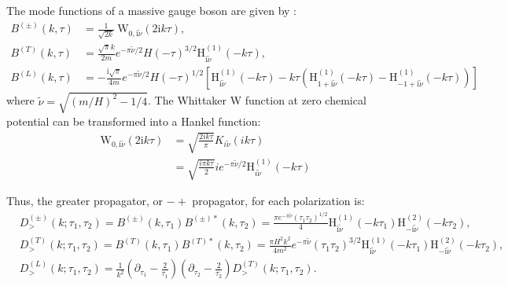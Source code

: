 \documentclass[a4paper,12pt]{article}
\begin{document}
The mode functions of a massive gauge boson are given by \cite{qin_helical_2023}:
\begin{align}
    B^{( \pm)}(k, \tau) & =\frac{1}{\sqrt{2 k}} \mathrm{~W}_{ 0, \mathrm{i} \tilde{\nu}}(2 \mathrm{i} k \tau), \\
    B^{(T)}(k, \tau) & =\frac{\sqrt{\pi} k}{2 m} e^{-\pi \tilde{\nu} / 2} H(-\tau)^{3 / 2} \mathrm{H}_{\mathrm{i} \tilde{\nu}}^{(1)}(-k \tau), \\
    B^{(L)}(k, \tau) & =-\frac{\mathrm{i} \sqrt{\pi}}{4 m} e^{-\pi \widetilde{\nu} / 2} H(-\tau)^{1 / 2}\left[\mathrm{H}_{\mathrm{i} \tilde{\nu}}^{(1)}(-k \tau)-k \tau\left(\mathrm{H}_{1+\mathrm{i} \tilde{\nu}}^{(1)}(-k \tau)-\mathrm{H}_{-1+\mathrm{i} \tilde{\nu}}^{(1)}(-k \tau)\right)\right]
\end{align}
where $\tilde\nu=\sqrt{(m/H)^2-1/4}$. The Whittaker W function at zero chemical potential can be transformed into a Hankel function:
\begin{align}
    \mathrm{~W}_{ 0, \mathrm{i} \tilde{\nu}}(2 \mathrm{i} k \tau) &= \sqrt{\frac{2ik\tau}{\pi}} K_{i \tilde\nu}(ik\tau) \nonumber \\
    &= \sqrt{\frac{ i\pi k\tau}{2}} ie^{-\pi \tilde\nu /2} \mathrm{H}^{(1)}_{i\tilde\nu}(-k\tau)
\end{align}

Thus, the greater propagator, or $-+$ propagator, for each polarization is:
\begin{align}
    &D_{>}^{( \pm)}\left(k ; \tau_{1}, \tau_{2}\right)=B^{( \pm)}\left(k, \tau_{1}\right) B^{( \pm) *}\left(k, \tau_{2}\right)=\frac{\pi e^{-\pi\tilde\nu} (\tau_1 \tau_2)^{1/2}}{4} \mathrm{H}_{\mathrm{i} \widetilde{\nu}}^{(1)}\left(-k \tau_{1}\right) \mathrm{H}_{-\mathrm{i} \widetilde{\nu}}^{(2)}\left(-k \tau_{2}\right), \\
    &D_{>}^{(T)}\left(k ; \tau_{1}, \tau_{2}\right)=B^{(T)}\left(k, \tau_{1}\right) B^{(T) *}\left(k, \tau_{2}\right)=\frac{\pi H^{2} k^{2}}{4 m^{2}} e^{-\pi \widetilde{\nu}}\left(\tau_{1} \tau_{2}\right)^{3 / 2} \mathrm{H}_{\mathrm{i} \widetilde{\nu}}^{(1)}\left(-k \tau_{1}\right) \mathrm{H}_{-\mathrm{i} \widetilde{\nu}}^{(2)}\left(-k \tau_{2}\right), \\
    &D_{>}^{(L)}\left(k ; \tau_{1}, \tau_{2}\right)=\frac{1}{k^{2}}\left(\partial_{\tau_{1}}-\frac{2}{\tau_{1}}\right)\left(\partial_{\tau_{2}}-\frac{2}{\tau_{2}}\right) D_{>}^{(T)}\left(k ; \tau_{1}, \tau_{2}\right).
\end{align}
\end{document}

